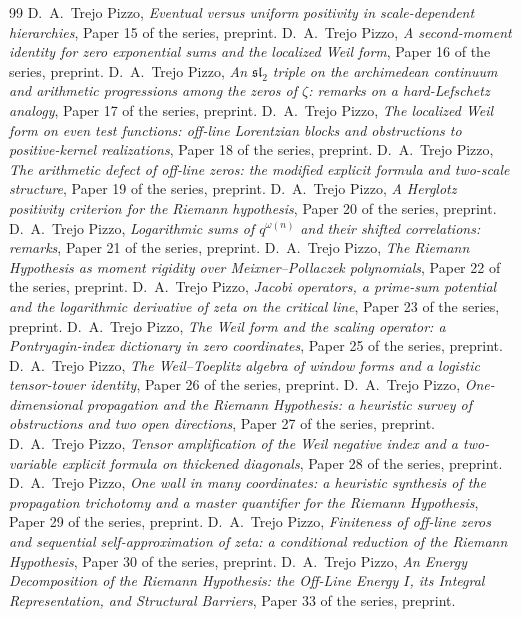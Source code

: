 \documentclass[11pt]{amsart}
\theoremstyle{definition}
\theoremstyle{remark}
\numberwithin{equation}{section}
\begin{document}
\begin{thebibliography}{99}
 D.~A.~Trejo Pizzo, \emph{Eventual versus uniform positivity in scale-dependent hierarchies}, Paper 15 of the series, preprint.
 D.~A.~Trejo Pizzo, \emph{A second-moment identity for zero exponential sums and the localized Weil form}, Paper 16 of the series, preprint.
 D.~A.~Trejo Pizzo, \emph{An $\mathfrak{sl}_2$ triple on the archimedean continuum and arithmetic progressions among the zeros of $\zeta$: remarks on a hard-Lefschetz analogy}, Paper 17 of the series, preprint.
 D.~A.~Trejo Pizzo, \emph{The localized Weil form on even test functions: off-line Lorentzian blocks and obstructions to positive-kernel realizations}, Paper 18 of the series, preprint.
 D.~A.~Trejo Pizzo, \emph{The arithmetic defect of off-line zeros: the modified explicit formula and two-scale structure}, Paper 19 of the series, preprint.
 D.~A.~Trejo Pizzo, \emph{A Herglotz positivity criterion for the Riemann hypothesis}, Paper 20 of the series, preprint.
 D.~A.~Trejo Pizzo, \emph{Logarithmic sums of $q^{\omega(n)}$ and their shifted correlations: remarks}, Paper 21 of the series, preprint.
 D.~A.~Trejo Pizzo, \emph{The Riemann Hypothesis as moment rigidity over Meixner--Pollaczek polynomials}, Paper 22 of the series, preprint.
 D.~A.~Trejo Pizzo, \emph{Jacobi operators, a prime-sum potential and the logarithmic derivative of zeta on the critical line}, Paper 23 of the series, preprint.
 D.~A.~Trejo Pizzo, \emph{The Weil form and the scaling operator: a Pontryagin-index dictionary in zero coordinates}, Paper 25 of the series, preprint.
 D.~A.~Trejo Pizzo, \emph{The Weil--Toeplitz algebra of window forms and a logistic tensor-tower identity}, Paper 26 of the series, preprint.
 D.~A.~Trejo Pizzo, \emph{One-dimensional propagation and the Riemann Hypothesis: a heuristic survey of obstructions and two open directions}, Paper 27 of the series, preprint.
 D.~A.~Trejo Pizzo, \emph{Tensor amplification of the Weil negative index and a two-variable explicit formula on thickened diagonals}, Paper 28 of the series, preprint.
 D.~A.~Trejo Pizzo, \emph{One wall in many coordinates: a heuristic synthesis of the propagation trichotomy and a master quantifier for the Riemann Hypothesis}, Paper 29 of the series, preprint.
 D.~A.~Trejo Pizzo, \emph{Finiteness of off-line zeros and sequential self-approximation of zeta: a conditional reduction of the Riemann Hypothesis}, Paper 30 of the series, preprint.
 D.~A.~Trejo Pizzo, \emph{An Energy Decomposition of the Riemann Hypothesis: the Off-Line Energy $I$, its Integral Representation, and Structural Barriers}, Paper 33 of the series, preprint.

\end{thebibliography}
\end{document}
